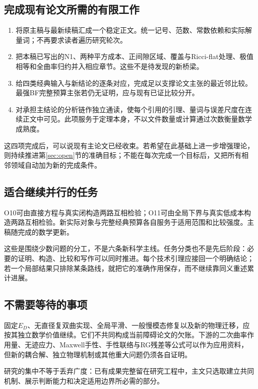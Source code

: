 \documentclass[UTF8,fontset=fandol,zihao=-4,a4paper]{ctexart}
\theoremstyle{remark}
\begin{document}
\subsection{完成现有论文所需的有限工作}

\begin{enumerate}
\item 将原主稿与最新续稿汇成一个稳定正文。统一记号、范数、常数依赖和实际解量词；不再要求读者遍历研究轮次。
\item 把本稿已写出的N1、两种平方成本、正间隙区域、覆盖与Ricci-flat处理、极值相等和全曲率归约并入相应章节。这些不是待发现的新桥梁。
\item 给四类经典输入与新结论的逐条对应，完成足以支撑论文主张的最近邻比较。最强BF完整预算主张若仍无证明，应与现有已证比较分开。
\item 对承担主结论的分析链作独立通读，使每个引用的引理、量词与误差尺度在连续正文中可见。此项服务于定理本身，不以文件数量或计算通过次数衡量数学成熟度。
\end{enumerate}

这四项完成后，可以说现有主论文已经收束。若希望在此基础上进一步增强理论，则持续推进第\ref{sec:open}节的准确目标；不能在每次完成一个目标后，又把所有相邻领域自动加为新的完成条件。

\subsection{适合继续并行的任务}

O10可由直接方程与真实闭构造两路互相检验；O11可由全局下界与真实低成本构造两路互相检验。新实际对象与完整经典预算各自服务于适用范围和比较强度。主稿随完成的数学更新。

这些是围绕少数问题的分工，不是六条新科学主线。任务分类也不是先后阶段：必要的证明、构造、比较和写作可以同时推进。每个技术引理应接回一个明确结论；若一个局部结果只排除某条路线，就把它的准确作用保存，而不继续靠同义重述累计进展。

\subsection{不需要等待的事项}

固定$E_D$、无直径复双曲实现、全局平滑、一般慢模态修复以及新的物理迁移，应按其独立数学价值继续。它们不共同构成当前障碍论文的欠账。下游的二次曲率作用量、无迹应力、Maxwell手性、手性联络与RG残差等公式可以作为应用资料，但新的耦合解、独立物理机制或其他重大问题仍须各自证明。

研究的集中不等于丢弃广度：已有成果完整留在研究工程中，主文只选取建立共同机制、展示判断能力和决定适用边界所必需的部分。
\end{document}
